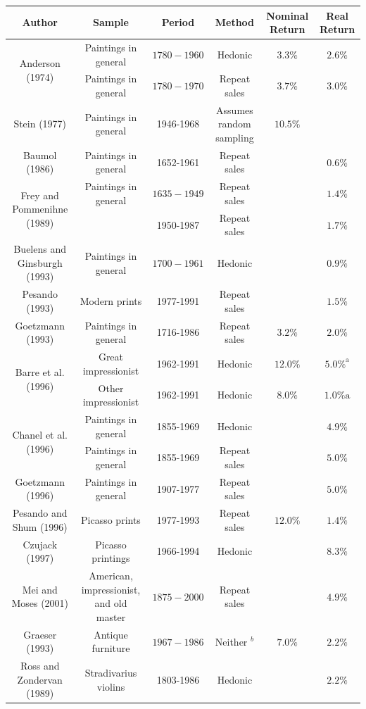 \documentclass[11pt]{article}
\begin{document}
\begin{center}
\begin{tabular}{|c|c|c|c|c|c|}
\hline
Author & Sample & Period & Method & Nominal Return & Real Return \\
\hline
\multirow[t]{2}{*}{Anderson (1974)} & Paintings in general & $1780-1960$ & Hedonic & $3.3 \%$ & $2.6 \%$ \\
\hline
 & Paintings in general & $1780-1970$ & Repeat sales & $3.7 \%$ & $3.0 \%$ \\
\hline
Stein (1977) & Paintings in general & 1946-1968 & Assumes random sampling & $10.5 \%$ &  \\
\hline
Baumol (1986) & Paintings in general & 1652-1961 & Repeat sales &  & $0.6 \%$ \\
\hline
\multirow[t]{2}{*}{Frey and Pommenihne (1989)} & Paintings in general & $1635-1949$ & Repeat sales &  & $1.4 \%$ \\
\hline
 &  & 1950-1987 & Repeat sales &  & $1.7 \%$ \\
\hline
Buelens and Ginsburgh (1993) & Paintings in general & $1700-1961$ & Hedonic &  & $0.9 \%$ \\
\hline
Pesando (1993) & Modern prints & 1977-1991 & Repeat sales &  & $1.5 \%$ \\
\hline
Goetzmann (1993) & Paintings in general & 1716-1986 & Repeat sales & $3.2 \%$ & $2.0 \%$ \\
\hline
\multirow[t]{2}{*}{Barre et al. (1996)} & Great impressionist & 1962-1991 & Hedonic & $12.0 \%$ & $5.0 \%^{\mathrm{a}}$ \\
\hline
 & Other impressionist & 1962-1991 & Hedonic & $8.0 \%$ & $1.0 \% \mathrm{a}$ \\
\hline
\multirow[t]{2}{*}{Chanel et al. (1996)} & Paintings in general & 1855-1969 & Hedonic &  & $4.9 \%$ \\
\hline
 & Paintings in general & 1855-1969 & Repeat sales &  & $5.0 \%$ \\
\hline
Goetzmann (1996) & Paintings in general & 1907-1977 & Repeat sales &  & $5.0 \%$ \\
\hline
Pesando and Shum (1996) & Picasso prints & 1977-1993 & Repeat sales & $12.0 \%$ & $1.4 \%$ \\
\hline
Czujack (1997) & Picasso printings & 1966-1994 & Hedonic &  & $8.3 \%$ \\
\hline
Mei and Moses (2001) & American, impressionist, and old master & $1875-2000$ & Repeat sales &  & $4.9 \%$ \\
\hline
Graeser (1993) & Antique furniture & $1967-1986$ & Neither ${ }^{b}$ & $7.0 \%$ & $2.2 \%$ \\
\hline
Ross and Zondervan (1989) & Stradivarius violins & 1803-1986 & Hedonic &  & $2.2 \%$ \\
\hline
\end{tabular}
\end{center}
\end{document}
